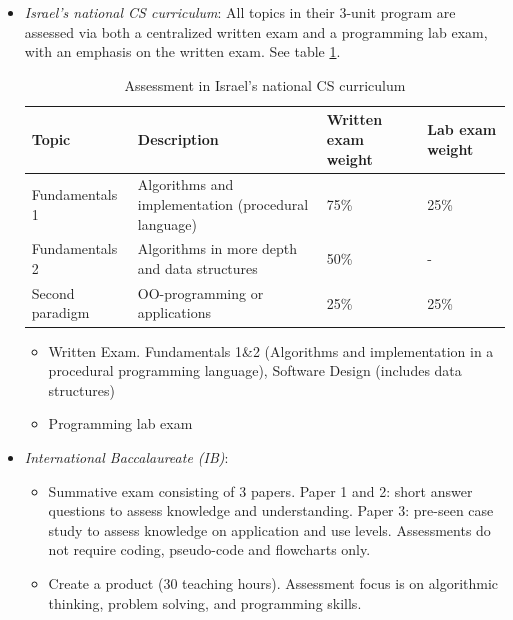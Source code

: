 \begin{itemize}
%

\item \emph{Israel's national CS curriculum}:
    All topics in their 3-unit program are assessed via both a centralized written exam and a programming lab exam, with an emphasis on the written exam.\cite{ezer1999curriculum} See table \ref{table:IsraelAssessment}.

\begin{table}
  \centering
\begin{tabular}{|l|p{70mm}|p{20mm}|p{20mm}|}
  \hline

  \textbf{Topic} & \textbf{Description} & \textbf{Written exam weight} &  \textbf{Lab exam weight} \\
  \hline
Fundamentals 1 & Algorithms and implementation (procedural language)& 75\% & 25\% \\ \hline
Fundamentals 2 & Algorithms in more depth and data structures & 50\% & - \\ \hline
Second paradigm & OO-programming or applications & 25\% & 25\% \\
  \hline
\end{tabular}
\caption{Assessment in Israel's national CS curriculum}\label{table:IsraelAssessment}
\end{table}
    \begin{itemize}
    \item Written Exam. Fundamentals 1\&2 (Algorithms and implementation in a procedural programming language), Software Design (includes data structures)
    \item Programming lab exam
    \end{itemize}

\item \emph{International Baccalaureate (IB)}:
    \begin{itemize}
    \item Summative exam consisting of 3 papers. Paper 1 and 2: short answer questions to assess knowledge and understanding.
	Paper 3: pre-seen case study to assess knowledge on application and use levels. Assessments do not require coding, pseudo-code and flowcharts only.

    \item Create a product (30 teaching hours). Assessment focus is on algorithmic thinking, problem solving, and programming skills.


\end{itemize}
\end{itemize}
